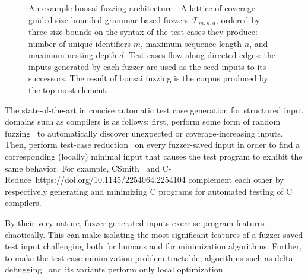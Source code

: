 \documentclass[conference]{IEEEtran}
\newcommand{\tech}{bonsai fuzzing} \newcommand{\Tech}{Bonsai fuzzing} \newcommand{\TECH}{Bonsai Fuzzing}
\begin{document}
\begin{figure}
    \centering
    \caption{An example \tech{} architecture---A lattice of coverage-guided size-bounded grammar-based fuzzers $\mathcal{F}_{m,n,d}$, ordered by three size bounds on the syntax of the test cases they produce: number of unique identifiers $m$, maximum sequence length $n$, and maximum nesting depth $d$. Test cases flow along directed edges: the inputs generated by each fuzzer are used as the seed inputs to its successors. The result of \tech{} is the corpus produced by the top-most element.}
    \label{fig:lattice}
\vspace{-0.5cm}
\end{figure}

The state-of-the-art in concise automatic test case generation for structured input domains such as compilers is as follows: first, perform some form of random fuzzing~\cite{Miller90, Godefroid20} to automatically discover unexpected or coverage-increasing inputs. Then, perform test-case reduction~\cite{Zeller02, Misherghi06} on every fuzzer-saved input in order to find a corresponding (locally) minimal input that causes the test program to exhibit the same behavior. For example, CSmith~\cite{Yang11} and C-Reduce~https://doi.org/10.1145/2254064.2254104 complement each other by respectively generating and minimizing C programs for automated testing of C compilers.

By their very nature, fuzzer-generated inputs exercise program features chaotically. This can make isolating the most significant features of a fuzzer-saved test input challenging both for humans and for minimization algorithms. Further, to make the test-case minimization problem tractable, algorithms such as delta-debugging~\cite{Zeller02} and its variants perform only local optimization. 
\end{document}
